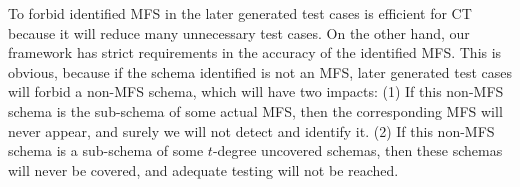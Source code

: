 \documentclass[journal,12pt,onecolumn,draftclsnofoot,]{IEEEtran}
\begin{document}
%
%




To forbid identified MFS in the later generated test cases is efficient for CT because it will reduce many unnecessary test cases. On the other hand, our framework has strict requirements in the accuracy of the identified MFS. This is obvious, because if the schema identified is not an MFS, later generated test cases will forbid a non-MFS schema, which will have two impacts: (1) If this non-MFS schema is the sub-schema of some actual MFS, then the corresponding MFS will never appear, and surely we will not detect and identify it. (2) If this non-MFS schema is a sub-schema of some $t$-degree uncovered schemas, then these schemas will never be covered, and adequate testing will not be reached.
\end{document}
